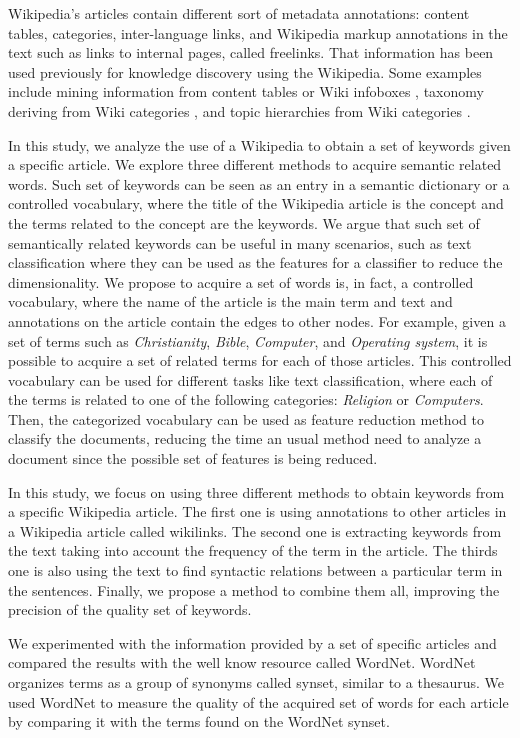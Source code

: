\documentclass[oribibl]{llncs}
\begin{document}
Wikipedia's articles contain different sort of metadata annotations: content tables, categories, inter-language links, and Wikipedia markup annotations in the text such as links to internal pages, called freelinks. That information has been used previously for knowledge discovery using the Wikipedia. Some examples include mining information from content tables or Wiki infoboxes \cite{Lin2011}, taxonomy deriving from Wiki categories \cite{Zesch2007}, and topic hierarchies from Wiki categories \cite{Hu2015}.

In this study, we analyze the use of a Wikipedia to obtain a set of keywords given a specific article. We explore three different methods to acquire semantic related words. Such set of keywords can be seen as an entry in a semantic dictionary or a controlled vocabulary, where the title of the Wikipedia article is the concept and the terms related to the concept are the keywords. We argue that such set of semantically related keywords can be useful in many scenarios, such as text classification where they can be used as the features for a classifier to reduce the dimensionality. We propose to acquire a set of words is, in fact, a controlled vocabulary, where the name of the article is the main term and text and annotations on the article contain the edges to other nodes. For example, given a set of terms such as {\it Christianity}, {\it Bible}, {\it Computer}, and {\it Operating system}, it is possible to acquire a set of related terms for each of those articles. This controlled vocabulary can be used for different tasks like text classification, where each of the terms is related to one of the following categories: {\it Religion} or {\it Computers}. Then, the categorized vocabulary can be used as feature reduction method to classify the documents, reducing the time an usual method need to analyze a document since the possible set of features is being reduced.  

In this study, we focus on using three different methods to obtain keywords from a specific Wikipedia article. The first one is using annotations to other articles in a Wikipedia article called wikilinks. The second one is extracting keywords from the text taking into account the frequency of the term in the article. The thirds one is also using the text to find syntactic relations between a particular term in the sentences. Finally, we propose a method to combine them all, improving the precision of the quality set of keywords.


We experimented with the information provided by a set of specific articles and compared the results with the well know resource called WordNet. WordNet organizes terms as a group of synonyms called synset, similar to a thesaurus. We used WordNet to measure the quality of the acquired set of words for each article by comparing it with the terms found on the WordNet synset. 
\end{document}

